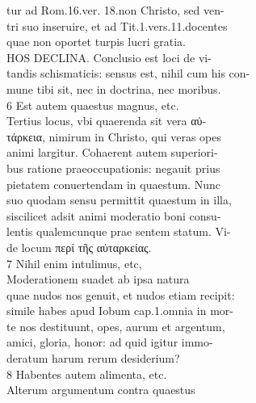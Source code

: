 \documentclass{article}
\begin{document}
\begin{pages}
                tur ad Rom.16.ver. 18.non Christo, sed ven- \\
                tri suo inseruire, et ad Tit.1.vers.11.docentes \\
                quae non oportet turpis lucri gratia. \\
                HOS DECLINA. Conclusio est loci de vi- \\
                tandis schismaticis: sensus est, nihil cum his con- \\
                mune tibi sit, nec in doctrina, nec moribus. \\
                6 Est autem quaestus magnus, etc. \\
                Tertius locus, vbi quaerenda sit vera αὐ- \\
                τάρκεια, nimirum in Christo, qui veras opes \\
                animi largitur. Cohaerent autem superiori- \\
                bus ratione praeoccupationis: negauit prius \\
                pietatem conuertendam in quaestum. Nunc \\
                suo quodam sensu permittit quaestum in illa, \\
                siscilicet adsit animi moderatio boni consu- \\
                lentis qualemcunque prae sentem statum. Vi- \\
                de locum περί τῆς αὐταρκείας. \\
                7 Nihil enim intulimus, etc, \\
                Moderationem suadet ab ipsa natura \\
                quae nudos nos genuit, et nudos etiam recipit: \\
                simile habes apud Iobum cap.1.omnia in mor- \\
                te nos destituunt, opes, aurum et argentum, \\
                amici, gloria, honor: ad quid igitur immo- \\
                deratum harum rerum desiderium? \\
                8 Habentes autem alimenta, etc. \\
                Alterum argumentum contra quaestus \\

\end{pages}
\end{document}
